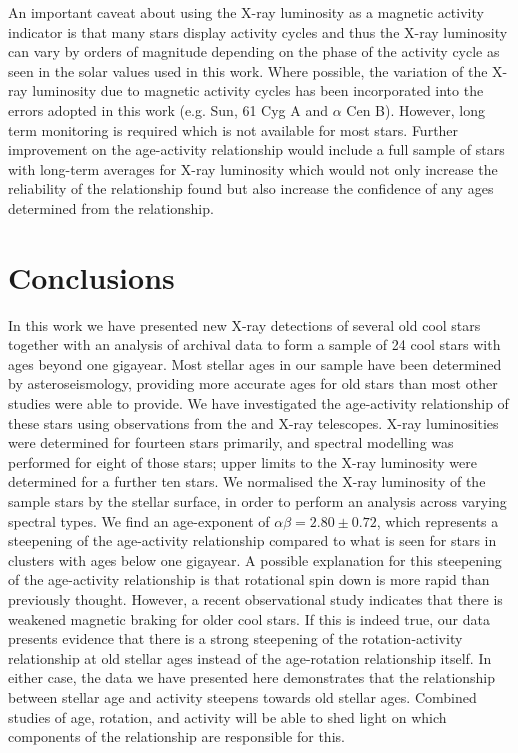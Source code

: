 An important caveat about using the X-ray luminosity as a magnetic activity indicator is that many stars display activity cycles and thus the X-ray luminosity can vary by orders of magnitude depending on the phase of the activity cycle as seen in the solar values used in this work. Where possible, the variation of the X-ray luminosity due to magnetic activity cycles has been incorporated into the errors adopted in this work (e.g. Sun, 61 Cyg A and $\alpha$ Cen B). However, long term monitoring is required which is not available for most stars. Further improvement on the age-activity relationship would include a full sample of stars with long-term averages for X-ray luminosity which would not only increase the reliability of the relationship found but also increase the confidence of any ages determined from the relationship.

\section{Conclusions}
In this work we have presented new X-ray detections of several old cool stars together with an analysis of archival data to form a sample of 24 cool stars with ages beyond one gigayear. Most stellar ages in our sample have been determined by asteroseismology, providing more accurate ages for old stars than most other studies were able to provide. We have investigated the age-activity relationship of these stars using observations from the \Chandra and \XMM X-ray telescopes. X-ray luminosities were determined for fourteen stars primarily, and spectral modelling was performed for eight of those stars; upper limits to the X-ray luminosity were determined for a further ten stars. We normalised the X-ray luminosity of the sample stars by the stellar surface, in order to  perform an analysis across varying spectral types. We find an age-exponent of $\alpha\beta = 2.80 \pm 0.72$, which represents a steepening of the age-activity relationship compared to what is seen for stars in clusters with ages below one gigayear.  A possible explanation for this steepening of the age-activity relationship is that rotational spin down is more rapid than previously thought. However, a recent observational study \citep{van_Saders_etal_2016} indicates that there is weakened magnetic braking for older cool stars. If this is indeed true, our data presents evidence that there is a strong steepening of the rotation-activity relationship at old stellar ages instead of the age-rotation relationship itself. In either case, the data we have presented here demonstrates that the relationship between stellar age and activity steepens towards old stellar ages. Combined studies of age, rotation, and activity will be able to shed light on which components of the relationship are responsible for this.

\newpage